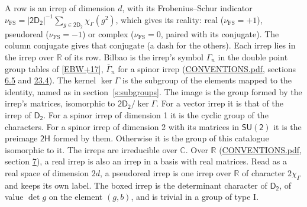 \documentclass[10pt,a4paper]{article}
\numberwithin{equation}{section}
\newcommand{\grp}[1]{\mathsf{#1}}
\newcommand{\irchar}[1]{\chi_{#1}}
\newcommand{\fsind}{\nu_{\mathrm{FS}}}
\begin{document}
\leavevmode\label{n:index.frobenius}\label{n:head.irrep}\label{n:head.reality}A row is an irrep of dimension $d$, with its Frobenius--Schur indicator $\fsind = |\grp{2D_{2}}|^{-1}\allowbreak\sum_{g\in\grp{2D_{2}}}\irchar{\Gamma}(g^2)$, which gives its reality: real ($\fsind = +1$), pseudoreal ($\fsind = -1$) or complex ($\fsind = 0$, paired with its conjugate). \label{n:head.conjugate}The column conjugate gives that conjugate (a dash for the others). \label{n:head.over.real}Each irrep lies in the irrep over $\mathbb{R}$ of its row. \label{n:head.bilbao}\label{n:irrep.alias.gamma}Bilbao is the irrep's symbol $\Gamma_n$ in the double point group tables of [\href{../../../REFERENCES.pdf\#ref.EBW+17}{EBW+17}], $\bar{\Gamma}_n$ for a spinor irrep (\href{../../CONVENTIONS.pdf}{CONVENTIONS.pdf}, sections \href{../../../rotation/CONVENTIONS.pdf\#conv.6.5}{6.5} and \href{../../CONVENTIONS.pdf\#conv.23.4}{23.4}). \label{n:head.kernel}The kernel $\ker\Gamma$ is the subgroup of the elements mapped to the identity, named as in section~\ref{s:subgroups}. \label{n:head.image}The image is the group formed by the irrep's matrices, isomorphic to $\grp{2D_{2}}/\ker\Gamma$. For a vector irrep it is that of the irrep of \href{../../../rotation/data/pdf/D2.pdf}{$\grp{D_{2}}$}. For a spinor irrep of dimension 1 it is the cyclic group of the characters. For a spinor irrep of dimension 2 with its matrices in $\grp{SU(2)}$ it is the preimage $\grp{2H}$ formed by them. Otherwise it is the group of this catalogue isomorphic to it. The irreps are irreducible over $\mathbb{C}$. Over $\mathbb{R}$ (\href{../../CONVENTIONS.pdf}{CONVENTIONS.pdf}, section \href{../../../rotation/CONVENTIONS.pdf\#conv.7}{7}), a real irrep is also an irrep in a basis with real matrices. Read as a real space of dimension $2d$, a pseudoreal irrep is one irrep over $\mathbb{R}$ of character $2\irchar{\Gamma}$ and keeps its own label. \label{n:mark.determinant}The boxed irrep is the determinant character of \href{../../../rotation/data/pdf/D2.pdf}{$\grp{D_{2}}$}, of value $\det g$ on the element $(g, b)$, and is trivial in a group of type I.
\setlength{\emergencystretch}{2em}\par\setlength{\emergencystretch}{0pt}
\end{document}
